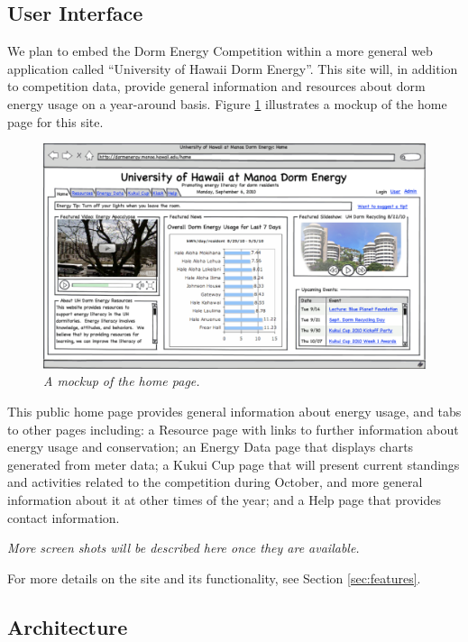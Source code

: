 \documentclass[11pt]{article}
\begin{document}
\subsection{User Interface}
\label{sec:userinterface}

We plan to embed the Dorm Energy Competition within a more general web
application called ``University of Hawaii Dorm Energy''.  This site will,
in addition to competition data, provide general information and resources
about dorm energy usage on a year-around basis.   Figure \ref{fig:homepage}
illustrates a mockup of the home page for this site. 

\begin{figure}[!ht]
  \center
  \includegraphics[width=1.0\textwidth]{home.tiff.eps}
  \caption{\em \small A mockup of the home page.}
 \label{fig:homepage}
\end{figure} 

This public home page provides general information about energy usage, and
tabs to other pages including: a Resource page with links to further
information about energy usage and conservation; an Energy Data page that
displays charts generated from meter data; a Kukui Cup page that will
present current standings and activities related to the competition during
October, and more general information about it at other times of the year;
and a Help page that provides contact information.

{\em More screen shots will be described here once they are available.}

For more details on the site and its functionality, see Section \ref{sec:features}.

\subsection{Architecture}
\end{document}
